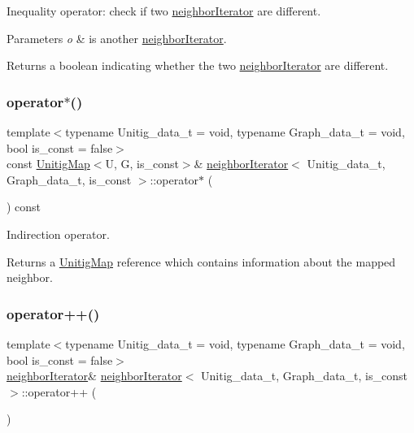 Inequality operator\+: check if two \hyperlink{classneighborIterator}{neighbor\+Iterator} are different. 


\begin{DoxyParams}{Parameters}
{\em o} & is another \hyperlink{classneighborIterator}{neighbor\+Iterator}. \\
\hline
\end{DoxyParams}
\begin{DoxyReturn}{Returns}
a boolean indicating whether the two \hyperlink{classneighborIterator}{neighbor\+Iterator} are different. 
\end{DoxyReturn}
\mbox{\label{classneighborIterator_a4481d0b5d4b31cc0e3f9064f8906f70b}} 
\subsubsection{\texorpdfstring{operator$\ast$()}{operator*()}}
{\footnotesize\ttfamily template$<$typename Unitig\+\_\+data\+\_\+t = void, typename Graph\+\_\+data\+\_\+t = void, bool is\+\_\+const = false$>$ \\
const \hyperlink{classUnitigMap}{Unitig\+Map}$<$U, G, is\+\_\+const$>$\& \hyperlink{classneighborIterator}{neighbor\+Iterator}$<$ Unitig\+\_\+data\+\_\+t, Graph\+\_\+data\+\_\+t, is\+\_\+const $>$\+::operator$\ast$ (\begin{DoxyParamCaption}{ }\end{DoxyParamCaption}) const}



Indirection operator. 

\begin{DoxyReturn}{Returns}
a \hyperlink{classUnitigMap}{Unitig\+Map} reference which contains information about the mapped neighbor. 
\end{DoxyReturn}
\mbox{\label{classneighborIterator_aa84a0c4942e9a9ba2245eb2572205c66}} 
\subsubsection{\texorpdfstring{operator++()}{operator++()}\hspace{0.1cm}{\footnotesize\ttfamily [1/2]}}
{\footnotesize\ttfamily template$<$typename Unitig\+\_\+data\+\_\+t = void, typename Graph\+\_\+data\+\_\+t = void, bool is\+\_\+const = false$>$ \\
\hyperlink{classneighborIterator}{neighbor\+Iterator}\& \hyperlink{classneighborIterator}{neighbor\+Iterator}$<$ Unitig\+\_\+data\+\_\+t, Graph\+\_\+data\+\_\+t, is\+\_\+const $>$\+::operator++ (\begin{DoxyParamCaption}{ }\end{DoxyParamCaption})}



